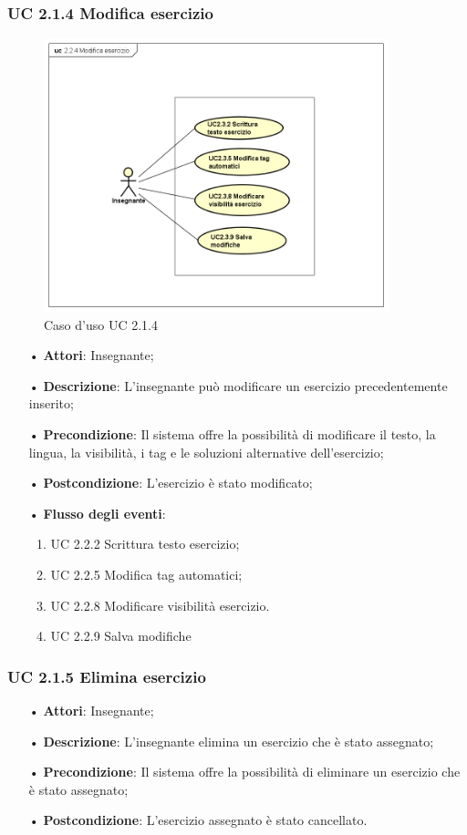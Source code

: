 \subsubsection{UC 2.1.4 Modifica esercizio}

\begin{figure}[H]
\centering
\includegraphics[width=10cm]{img/UC214.png} 
\caption{Caso d'uso UC 2.1.4}
\end{figure}

\begin{itemize}
	\item[•] \textbf{Attori}: Insegnante;
	\item[•] \textbf{Descrizione}: L’insegnante può modificare un esercizio precedentemente inserito;
	\item[•] \textbf{Precondizione}: Il sistema offre la possibilità di modificare il testo, la
				lingua, la visibilità, i {tag} e le soluzioni alternative 
				dell’esercizio;
	\item[•] \textbf{Postcondizione}: L’esercizio è stato modificato;
	\item[•] \textbf{Flusso degli eventi}:
		\begin{enumerate}
			\item UC 2.2.2 Scrittura testo esercizio;
			\item UC 2.2.5 Modifica tag automatici;
			\item UC 2.2.8 Modificare visibilità esercizio.
			\item UC 2.2.9 Salva modifiche
		\end{enumerate}
		    
\end{itemize}   	
	
\subsubsection{UC 2.1.5 Elimina esercizio}
\begin{itemize}
	\item[•] \textbf{Attori}: Insegnante;
	\item[•] \textbf{Descrizione}: L’insegnante elimina un esercizio che è stato assegnato;
	\item[•] \textbf{Precondizione}: Il sistema offre la possibilità di eliminare un esercizio che è stato assegnato;
	\item[•] \textbf{Postcondizione}: L’esercizio assegnato è stato cancellato.
\end{itemize}

